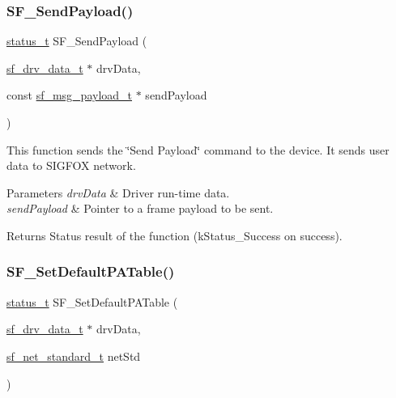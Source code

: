 \subsubsection{\texorpdfstring{SF\_SendPayload()}{SF\_SendPayload()}}
{\footnotesize\ttfamily \mbox{\hyperlink{group__ksdk__common_gaaabdaf7ee58ca7269bd4bf24efcde092}{status\+\_\+t}} S\+F\+\_\+\+Send\+Payload (\begin{DoxyParamCaption}\item[{\mbox{\hyperlink{structsf__drv__data__t}{sf\+\_\+drv\+\_\+data\+\_\+t}} $\ast$}]{drv\+Data,  }\item[{const \mbox{\hyperlink{structsf__msg__payload__t}{sf\+\_\+msg\+\_\+payload\+\_\+t}} $\ast$}]{send\+Payload }\end{DoxyParamCaption})}



This function sends the \char`\"{}\+Send Payload\char`\"{} command to the device. It sends user data to S\+I\+G\+F\+OX network. 


\begin{DoxyParams}{Parameters}
{\em drv\+Data} & Driver run-\/time data. \\
\hline
{\em send\+Payload} & Pointer to a frame payload to be sent.\\
\hline
\end{DoxyParams}
\begin{DoxyReturn}{Returns}
Status result of the function (k\+Status\+\_\+\+Success on success). 
\end{DoxyReturn}
\mbox{\label{group__sf__functions__group_gad44ab2d70a7132b381104107168ba771}} 
\subsubsection{\texorpdfstring{SF\_SetDefaultPATable()}{SF\_SetDefaultPATable()}}
{\footnotesize\ttfamily \mbox{\hyperlink{group__ksdk__common_gaaabdaf7ee58ca7269bd4bf24efcde092}{status\+\_\+t}} S\+F\+\_\+\+Set\+Default\+P\+A\+Table (\begin{DoxyParamCaption}\item[{\mbox{\hyperlink{structsf__drv__data__t}{sf\+\_\+drv\+\_\+data\+\_\+t}} $\ast$}]{drv\+Data,  }\item[{\mbox{\hyperlink{group__sf__enum__group_ga9ad07e4b666d7d70f7a69614ecb89421}{sf\+\_\+net\+\_\+standard\+\_\+t}}}]{net\+Std }\end{DoxyParamCaption})}



